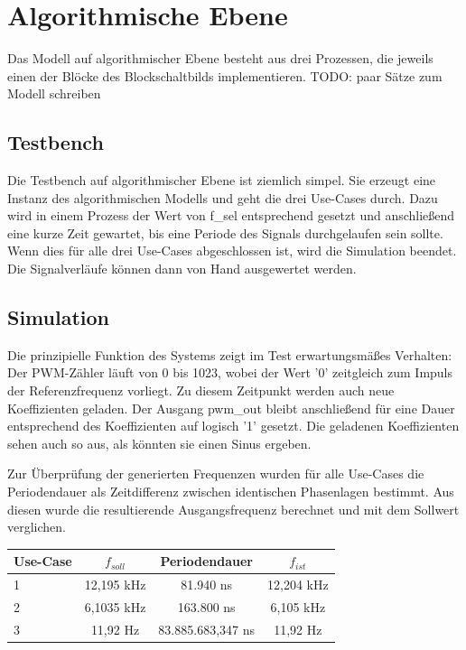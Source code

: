 \section{Algorithmische Ebene}
Das Modell auf algorithmischer Ebene besteht aus drei Prozessen, die jeweils einen der Blöcke des Blockschaltbilds implementieren.
TODO: paar Sätze zum Modell schreiben

\subsection{Testbench}
Die Testbench auf algorithmischer Ebene ist ziemlich simpel.
Sie erzeugt eine Instanz des algorithmischen Modells und geht die drei Use-Cases durch.
Dazu wird in einem Prozess der Wert von f\_sel entsprechend gesetzt und anschließend eine kurze Zeit gewartet, bis eine Periode des Signals durchgelaufen sein sollte.
Wenn dies für alle drei Use-Cases abgeschlossen ist, wird die Simulation beendet.
Die Signalverläufe können dann von Hand ausgewertet werden.

\subsection{Simulation}
Die prinzipielle Funktion des Systems zeigt im Test erwartungsmäßes Verhalten:
Der PWM-Zähler läuft von 0 bis 1023, wobei der Wert '0' zeitgleich zum Impuls der Referenzfrequenz vorliegt.
Zu diesem Zeitpunkt werden auch neue Koeffizienten geladen.
Der Ausgang pwm\_out bleibt anschließend für eine Dauer entsprechend des Koeffizienten auf logisch '1' gesetzt.
Die geladenen Koeffizienten sehen auch so aus, als könnten sie einen Sinus ergeben.

\noindent Zur Überprüfung der generierten Frequenzen wurden für alle Use-Cases die Periodendauer als Zeitdifferenz zwischen identischen Phasenlagen bestimmt.
Aus diesen wurde die resultierende Ausgangsfrequenz berechnet und mit dem Sollwert verglichen.
\\
\begin{table}[h]
    \centering
    \begin{tabular}{lccc}
        \toprule
        \textbf{Use-Case} & \textbf{$f_{soll}$} & \textbf{Periodendauer} & \textbf{$f_{ist}$} \\
        \midrule
        1 & 12,195 kHz & 81.940 ns & 12,204 kHz \\
        2 & 6,1035 kHz & 163.800 ns & 6,105 kHz \\
        3 & 11,92 Hz & 83.885.683,347 ns & 11,92 Hz \\
        \bottomrule
    \end{tabular}
\end{table}

